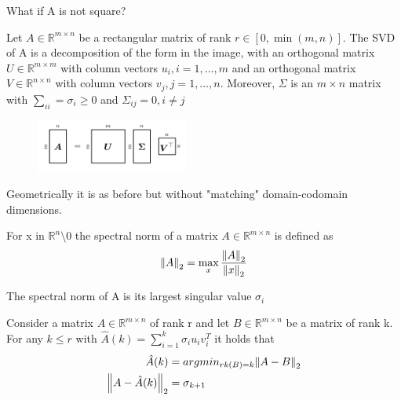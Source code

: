 What if A is not square? 
\begin{theorem}
    Let $A \in \mathbb{R}^{m\times n}$ be a rectangular matrix of rank $r \in [0,\min(m,n)]$. The SVD of A is a decomposition of the form in the image, with an orthogonal matrix $U \in \mathbb{R}^{m\times m}$ with column vectors $u_i, i = 1, \ldots,m$ and an orthogonal matrix $V \in \mathbb{R}^{n\times n}$ with column vectors $v_j, j = 1, \ldots,n$. Moreover, $\Sigma$ is an $m \times n$ matrix with $ \sum_{ii} = \sigma_i \geq 0$ and $\Sigma_{ij} = 0, i\neq j$ 
\end{theorem}
\begin{figure}[htbp]
    \centering
    \includegraphics[width=5cm]{Math/svd-diagram.png}
\end{figure}
Geometrically it is as before but without "matching" domain-codomain dimensions. 
\begin{definition}
    For x in $\mathbb{R}^n \setminus {0}$ the spectral norm of a matrix $A \in \mathbb{R}^{m\times n}$ is defined as 
    \[ 
        \left\lVert A\right\rVert_2 = \max_{x}{\frac{\left\lVert A\right\rVert_2}{\left\lVert x\right\rVert_2}} 
    \]
\end{definition}
\begin{theorem}
    The spectral norm of A is its largest singular value $\sigma_i$
\end{theorem}
\begin{theorem}
    Consider a matrix $A \in \mathbb{R}^{m\times n}$ of rank r and let $B \in \mathbb{R}^{m\times n}$ be a matrix of rank k. For any $k\leq r$ with $\hat{A}(k) = \sum_{i=1}^{k}{\sigma_iu_iv_i^T}$ it holds that
    \begin{align*}
        \hat{A}(k) &= argmin_{rk(B)=k}{\left\lVert A-B\right\rVert_2}\\
        \left\lVert A-\hat{A}(k)\right\rVert_2 &= \sigma_{k+1}
    \end{align*}
\end{theorem}